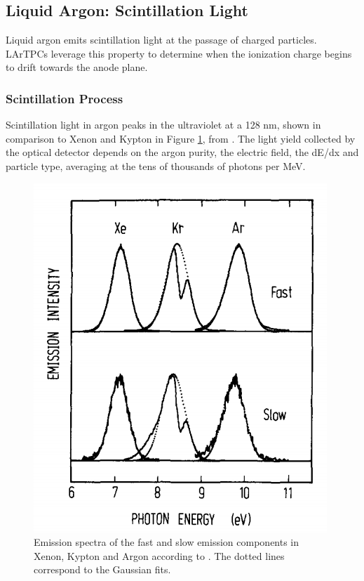 \subsection{Liquid Argon: Scintillation Light }\label{sec:light}
Liquid argon emits scintillation light at the passage of charged particles. LArTPCs  leverage this property to determine when the ionization charge begins to drift towards the anode plane. %

\subsubsection{Scintillation Process}
Scintillation light in argon peaks in the ultraviolet at a 128 nm, shown in comparison to Xenon and Kypton in Figure  \ref{fig:ArLight}, from \cite{Morikawa1989}. The light yield collected by the optical detector depends on the argon purity, the electric field, the dE/dx and particle type, averaging at the tens of thousands of photons per MeV. 

\begin{figure}[hbpt]
\centering
\includegraphics[scale=0.5]{Chapter-2/Images/Light.png}
\caption{Emission spectra of the fast and slow emission components in Xenon, Kypton and Argon according to \cite{Morikawa1989}. The dotted lines correspond to the Gaussian fits. }
\label{fig:ArLight}
\end{figure}




